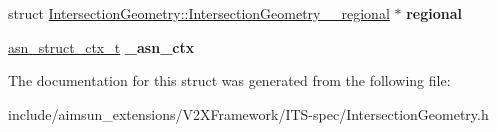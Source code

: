 \begin{DoxyCompactItemize}
\item 
struct \hyperlink{structIntersectionGeometry_1_1IntersectionGeometry____regional}{Intersection\+Geometry\+::\+Intersection\+Geometry\+\_\+\+\_\+regional} $\ast$ {\bfseries regional}\hypertarget{structIntersectionGeometry_a9823230707ea19ba95f501ea7630b07d}{}\label{structIntersectionGeometry_a9823230707ea19ba95f501ea7630b07d}

\item 
\hyperlink{structasn__struct__ctx__s}{asn\+\_\+struct\+\_\+ctx\+\_\+t} {\bfseries \+\_\+asn\+\_\+ctx}\hypertarget{structIntersectionGeometry_ad4a1627a29ca1d14f90520a4523135de}{}\label{structIntersectionGeometry_ad4a1627a29ca1d14f90520a4523135de}

\end{DoxyCompactItemize}


The documentation for this struct was generated from the following file\+:\begin{DoxyCompactItemize}
\item 
include/aimsun\+\_\+extensions/\+V2\+X\+Framework/\+I\+T\+S-\/spec/Intersection\+Geometry.\+h\end{DoxyCompactItemize}
